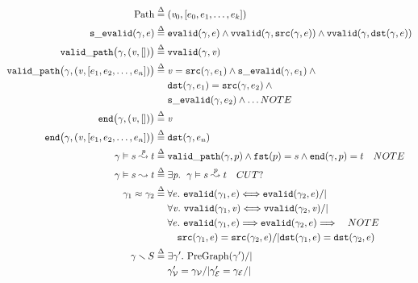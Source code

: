 \begin{figure}
	\begin{gather*}
     	\begin{aligned}
    	\mathrm{Path} \; \defeq \; &(\m{v}_0, [e_0, e_1, \dots, e_k]) \\ 
    	\mathtt{s\_evalid}(\gamma, e) \; \defeq \; &\mathtt{evalid}(\gamma, e) \wedge \null
    	\mathtt{vvalid}(\gamma, \mathtt{src}(\gamma,e))\wedge
    	\mathtt{vvalid}(\gamma, \mathtt{dst}(\gamma,e)) \\
		\mathtt{valid\_path}\big(\gamma, (\m{v},[])\big) \;\defeq \; &\mathtt{vvalid}(\gamma, \m{v}) \\
		\mathtt{valid\_path}\big(\gamma, (\m{v},[e_1,e_2,\dots,e_n])\big) \; \defeq \; &\m{v}=\mathtt{src}(\gamma,e_1) \wedge \mathtt{s\_evalid}(\gamma,e_1) \wedge \null \\
    &\mathtt{dst}(\gamma,e_1)=\mathtt{src}(\gamma,e_2) \wedge \null\\
    &\mathtt{s\_evalid}(\gamma, e_2) \wedge \dots NOTE \\ 
        \mathtt{end}\big(\gamma, (\m{v}, [])\big)\;\defeq\;& \m{v}\\
      	\mathtt{end}\big(\gamma, (\m{v},[e_1,e_2,\dots,e_n])\big)\;\defeq\;&
      	\mathtt{dst}(\gamma, e_n)\\
      	\gamma \vDash s \overset{\m{p}}{\leadsto} t \;\defeq\; &
        \mathtt{valid\_path}(\gamma, p)\wedge
        \mathtt{fst}(p)=s \wedge \mathtt{end}(\gamma,p)=t \quad NOTE \\
        \gamma \vDash s \leadsto t \;\defeq\; &
        \exists \m{p}.~ \; \gamma \vDash s \overset{p}{\leadsto} t \quad CUT? \\  
        \gamma_1 \approx \gamma_2 \; \defeq \; & 
        	\forall e.~\mathtt{evalid}(\gamma_1, e) <=> \mathtt{evalid}(\gamma_2, e) /| \null \\ 
        	&\forall \m{v}.~\mathtt{vvalid}(\gamma_1, \m{v}) <=> \mathtt{vvalid}(\gamma_2, \m{v}) /| \null \\
        	&\forall e.~\mathtt{evalid}(\gamma_1, e) ==> \mathtt{evalid}(\gamma_2, e) ==> \null \quad NOTE \\ 
        	& \quad \mathtt{src}(\gamma_1, e) = \mathtt{src}(\gamma_2, e) /| \mathtt{dst}(\gamma_1, e) = \mathtt{dst}(\gamma_2, e) \\
       	\gamma \smallsetminus S \; \defeq \; & \exists \gamma'.~\mathrm{PreGraph}(\gamma') /| \null \\
       	 	& \gamma'_{\mathcal{V}} = \gamma_{\mathcal{V}}/|
       	 	\gamma'_{\mathcal{E}} = \gamma_{\mathcal{E}}/|

\end{aligned}
\end{gather*}
\end{figure}

